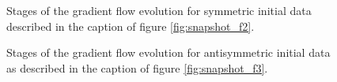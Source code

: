 \begin{figure}[h]
  \centering \advance\leftskip-3cm
  
  \caption{Stages of the gradient flow evolution for symmetric initial
    data described in the caption of figure \ref{fig:snapshot_f2}.}
  \label{fig:Stages_f2}
\end{figure}

\begin{figure}[h]
  \centering \advance\leftskip-3cm
  
  \caption{Stages of the gradient flow evolution for antisymmetric
    initial data as described in the caption of figure \ref{fig:snapshot_f3}.}
  \label{fig:Stages_f3}
\end{figure}

